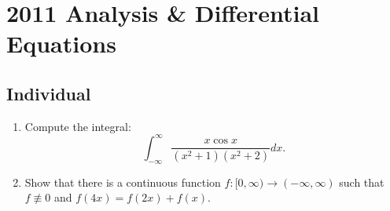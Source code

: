 \section{2011 Analysis \& Differential Equations}

\subsection{Individual}

\begin{exercise}
\label{analysis:2011:1}
\begin{enumerate}
    \item Compute the integral:
    \[
    \int_{-\infty}^{\infty} \frac{x \cos x}{(x^2+1)(x^2+2)} dx.
    \]
    \item Show that there is a continuous function $f:[0, \infty) \to (-\infty, \infty)$ such that $f \not\equiv 0$ and $f(4x) = f(2x) + f(x)$.
\end{enumerate}
\end{exercise}

